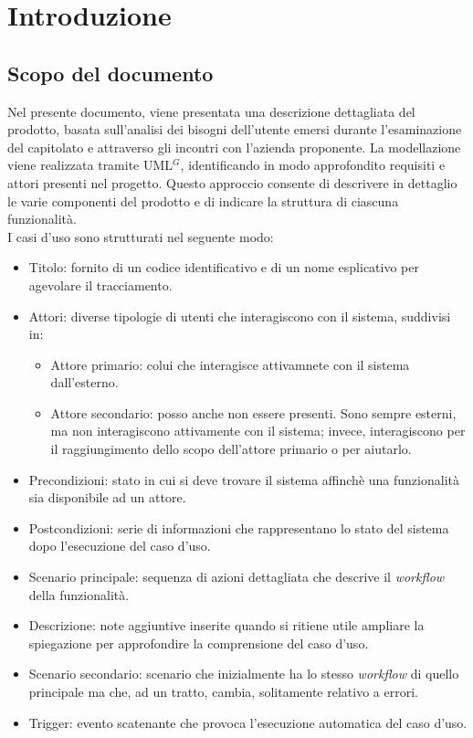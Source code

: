 \section{Introduzione}

\subsection{Scopo del documento}
Nel presente documento, viene presentata una descrizione dettagliata del prodotto, basata sull'analisi dei bisogni dell'utente 
emersi durante l'esaminazione del capitolato e attraverso gli incontri con l'azienda proponente. 
La modellazione viene realizzata tramite UML$^G$, identificando in modo approfondito requisiti e attori presenti nel progetto. 
Questo approccio consente di descrivere in dettaglio le varie componenti del prodotto e di indicare la struttura di ciascuna funzionalità.\\

\noindent
I casi d'uso sono strutturati nel seguente modo:
\begin{itemize}
	\item Titolo: fornito di un codice identificativo e di un nome esplicativo per agevolare il tracciamento.
	\item Attori: diverse tipologie di utenti che interagiscono con il sistema, suddivisi in:
	\begin{itemize}
		\item Attore primario: colui che interagisce attivamnete con il sistema dall'esterno.
		\item Attore secondario: posso anche non essere presenti. 
		Sono sempre esterni, ma non interagiscono attivamente con il sistema; invece, interagiscono per il raggiungimento dello scopo dell'attore primario o per aiutarlo.
	\end{itemize}
	\item Precondizioni: stato in cui si deve trovare il sistema affinchè una funzionalità sia disponibile ad un attore.
	\item Postcondizioni: serie di informazioni che rappresentano lo stato del sistema dopo l'esecuzione del caso d'uso.
	\item Scenario principale: sequenza di azioni dettagliata che descrive il \textit{workflow} della funzionalità.
	\item Descrizione: note aggiuntive inserite quando si ritiene utile ampliare la spiegazione per approfondire la comprensione del caso d'uso.
	\item Scenario secondario: scenario che inizialmente ha lo stesso \textit{workflow} di quello principale ma che, ad un tratto, cambia, solitamente relativo a errori.
	\item Trigger: evento scatenante che provoca l'esecuzione automatica del caso d'uso.
\end{itemize}

